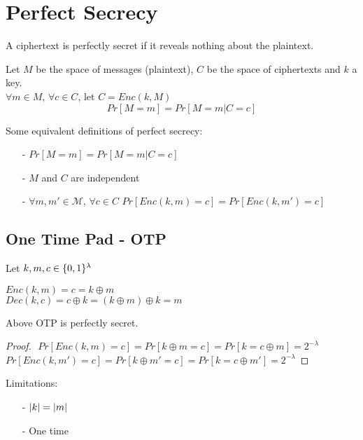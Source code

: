 \chapter{Perfect Secrecy}

A ciphertext is perfectly secret if it reveals nothing about the plaintext.

Let $M$ be the space of messages (plaintext), $C$ be the space of ciphertexts and $k$ a key.\\
$\forall m \in M$, $\forall c \in C$, let $C = Enc(k,M)$
\[ Pr[M = m] = Pr[M=m \vert C=c] \]

Some equivalent definitions of perfect secrecy:
\begin{itemize}
    \item[-] $Pr[M = m] = Pr[M=m \vert C=c]$
    \item[-] $M$ and $C$ are independent
    \item[-] $\forall m,m' \in \mathcal{M}$, $\forall c \in C$ $Pr[Enc(k,m)=c] = Pr[Enc(k,m')=c]$  
\end{itemize}


\section{One Time Pad - OTP}
Let $k,m,c \in \{0,1\}^\lambda$

$Enc(k,m) = c = k \oplus m$\\
$Dec(k,c) = c \oplus k = (k \oplus m) \oplus k = m$

\begin{theorem}
    Above OTP is perfectly secret.
\end{theorem}

\begin{proof}
$ $\newline
$Pr[Enc(k,m)=c] = Pr[k \oplus m = c] = Pr[k = c \oplus m] = 2^{-\lambda}$\\
$Pr[Enc(k,m')=c] = Pr[k \oplus m' = c] = Pr[k = c \oplus m'] = 2^{-\lambda}$
\end{proof}

Limitations:
\begin{itemize}
    \item[-] $\vert k \vert = \vert m \vert$
    \item[-] One time 
\end{itemize}